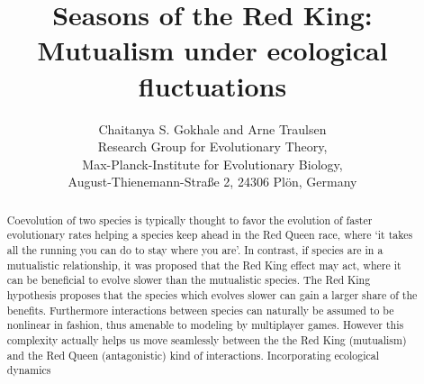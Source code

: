 \documentclass[a4paper]{scrartcl}
\begin{document}
\sffamily
\title{
Seasons of the Red King: Mutualism under ecological fluctuations
}   
\author{Chaitanya S. Gokhale and Arne Traulsen\\
Research Group for Evolutionary Theory,\\
Max-Planck-Institute for Evolutionary Biology,\\
August-Thienemann-Stra{\ss}e 2, 24306 Pl\"{o}n, Germany
}

\date{}    
\maketitle

\onehalfspacing

\begin{abstract}
{
\sffamily
Coevolution of two species is typically thought to favor the evolution of faster evolutionary rates helping a species keep ahead in the Red Queen race,
where `it takes all the running you can do to stay where you are'.
In contrast, if species are in a mutualistic relationship, it was proposed that the Red King effect may act, where it can be beneficial to evolve slower than the mutualistic species.
The Red King hypothesis proposes that the species which evolves slower can gain a larger share of the benefits.
Furthermore interactions between species can naturally be assumed to be nonlinear in fashion, thus amenable to modeling by multiplayer games.
However this complexity actually helps us move seamlessly between the the Red King (mutualism) and the Red Queen (antagonistic) kind of interactions.
Incorporating ecological dynamics 
}
\end{abstract}

\sffamily
\end{document}
